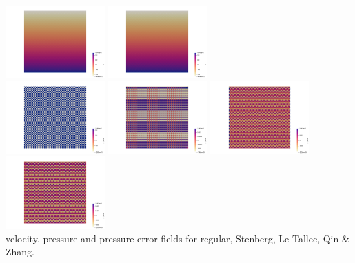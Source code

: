 \begin{center}
\includegraphics[width=3.8cm]{python_codes/fieldstone_78/results/aquarium/p2}
\includegraphics[width=3.8cm]{python_codes/fieldstone_78/results/aquarium/p3}\\
\includegraphics[width=3.8cm]{python_codes/fieldstone_78/results/aquarium/p_error_0}
\includegraphics[width=3.8cm]{python_codes/fieldstone_78/results/aquarium/p_error_1}
\includegraphics[width=3.8cm]{python_codes/fieldstone_78/results/aquarium/p_error_2}
\includegraphics[width=3.8cm]{python_codes/fieldstone_78/results/aquarium/p_error_3}\\
{\captionfont velocity, pressure and pressure error 
fields for regular, Stenberg, Le Tallec, Qin \& Zhang.} 
\end{center}

